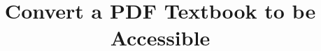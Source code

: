 \documentclass{ltx-talk}
\begin{document}
%


\title{Convert a PDF Textbook to be Accessible}


\begin{frame}\thispagestyle{empty}
\end{frame}
\end{document}
